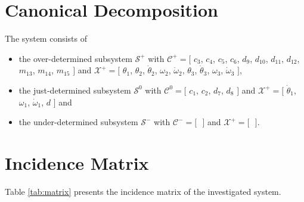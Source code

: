 \documentclass[a4,11pt]{article}
\begin{document}
\section{Canonical Decomposition}The system consists of
\begin{itemize}	\item the over-determined subsystem $\mathcal{S}^+$ with $\mathcal{C}^+ = [$ $c_3$, $c_4$, $c_5$, $c_6$, $d_9$, $d_{10}$, $d_{11}$, $d_{12}$, $m_{13}$, $m_{14}$, $m_{15} $ $]$ and $\mathcal{X}^+ = [$ $\theta_1$, $\theta_2$, $\dot{\theta}_2$, $\omega_2$, $\dot{\omega}_2$, $\theta_3$, $\dot{\theta}_3$, $\omega_3$, $\dot{\omega}_3 $ $]$,
	\item the just-determined subsystem $\mathcal{S}^0$ with $\mathcal{C}^0 = [$ $c_1$, $c_2$, $d_7$, $d_8 $ $]$ and $\mathcal{X}^+ = [$ $\dot{\theta}_1$, $\omega_1$, $\dot{\omega}_1$, $d $ $]$ and
	\item the under-determined subsystem $\mathcal{S}^-$ with $\mathcal{C}^- = [$ $ $ $]$ and $\mathcal{X}^+ = [$ $ $ $]$.
\end{itemize}
\section{Incidence Matrix}
Table \ref{tab:matrix} presents the incidence matrix of the investigated system.\setlength\tabcolsep{2mm}
\end{document}
